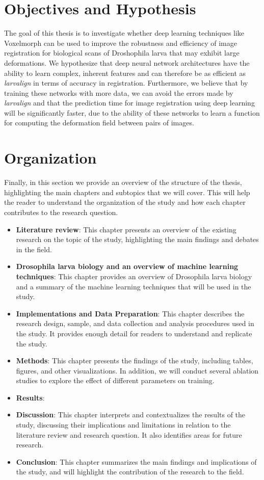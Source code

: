 \documentclass{report}
\begin{document}
	\section{Objectives and Hypothesis}
	The goal of this thesis is to investigate whether deep learning techniques like Voxelmorph \cite{Balakrishnan_2019} can be used to improve the robustness and efficiency of image registration for biological scans of Droshophila larva that may exhibit large deformations. We hypothesize that deep neural network architectures have the ability to learn complex, inherent features and can therefore be as efficient as \textit{larvalign} \cite{larvalign} in terms of accuracy in registration. Furthermore, we believe that by training these networks with more data, we can avoid the errors made by \textit{larvalign} \cite{larvalign} and that the prediction time for image registration using deep learning will be significantly faster, due to the ability of these networks to learn a function for computing the deformation field between pairs of images.

	\section{Organization}
	Finally, in this section we provide an overview of the structure of the thesis, highlighting the main chapters and subtopics that we will cover. This will help the reader to understand the organization of the study and how each chapter contributes to the research question.
	
	\begin{itemize}
		\item \textbf{Literature review}: This chapter presents an overview of the existing research on the topic of the study, highlighting the main findings and debates in the field.
		\item \textbf{Drosophila larva biology and an overview of machine learning techniques}: This chapter provides an overview of Drosophila larva biology and a summary of the machine learning techniques that will be used in the study.
		\item \textbf{Implementations and Data Preparation}: This chapter describes the research design, sample, and data collection and analysis procedures used in the study. It provides enough detail for readers to understand and replicate the study.
		\item \textbf{Methods}: This chapter presents the findings of the study, including tables, figures, and other visualizations. In addition, we will conduct several ablation studies to explore the effect of different parameters on training.
		\item \textbf{Results}:
		\item \textbf{Discussion}: This chapter interprets and contextualizes the results of the study, discussing their implications and limitations in relation to the literature review and research question. It also identifies areas for future research.
		\item \textbf{Conclusion}: This chapter summarizes the main findings and implications of the study, and will highlight the contribution of the research to the field.
	\end{itemize}
	
\end{document}
